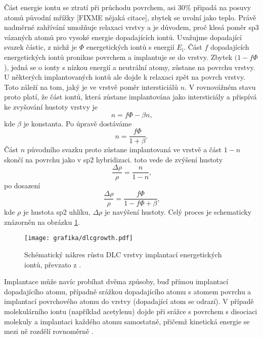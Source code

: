 Část energie iontu se ztratí při průchodu povrchem, asi 30\% připadá na posuvy atomů původní mřížky [FIXME nějaká citace], zbytek se uvolní jako teplo. Právě nadměrné zahřívání umožňuje relaxaci vrstvy a je důvodem, proč klesá poměr sp3 vázaných atomů pro vysoké energie dopadajících iontů. Uvažujme dopadající svazek částic, z nichž je $\Phi$ energetických iontů s energií $E_\mathrm{i}$. Část $f$ dopadajících energetických iontů pronikne povrchem a implantuje se do vrstvy. Zbytek $(1-f \Phi$), jedná se o ionty s nízkou energií a neutrální atomy, zůstane na povrchu vrstvy. U některých implantovaných iontů ale dojde k relaxaci zpět na povrch vrstvy. Toto záleží na tom, jaký je ve vrstvě poměr intersticiálů $n$. V rovnovážném stavu proto platí, že část iontů, která zůstane implantována jako intersticiály a přispívá ke zvyšování hustoty vrstvy je 
\begin{equation}
n = f \Phi - \beta n \text{,}
\end{equation}
kde $\beta$ je konstanta. Po úpravě dostáváme
\begin{equation}
n = \frac{f \Phi}{1 + \beta} \text{.}
\end{equation} 
Část $n$ původního svazku proto zůstane implantovaná ve vrstvě a část $1-n$ skončí na povrchu jako v sp2 hybridizaci. toto vede de zvýšení hustoty
\begin{equation}
\frac{\Delta \rho}{\rho} = \frac{n}{1-n} \text{,}
\end{equation}  
po dosazení
\begin{equation}
\frac{\Delta \rho}{\rho} = \frac{f \Phi}{1 - f \Phi + \beta} \text{,}
\end{equation}
kde $\rho$ je hustota sp2 uhlíku, $\Delta \rho$ je navýšení hustoty. Celý proces je schematicky znázorněn na obrázku \ref{dlcgrowth}.

\begin{figure}[htbp]
  \centering
  \texttt{[image: grafika/dlcgrowth.pdf]}
  \caption{Schématický nákres růstu DLC vrstvy implantací energetických iontů, převzato z \cite{Robertson2002}.}
  \label{dlcgrowth}
\end{figure}

Implantace může navíc probíhat dvěma způsoby, buď přímou implantací dopadajícího atomu, případně srážkou dopadajícího atomu s atomem povrchu a implantací povrchového atomu do vrstvy (dopadající atom se odrazí). V případě molekulárního iontu (například acetylenu) dojde při srážce s povrchem s disociaci molekuly a implantaci každého atomu samostatně, přičemž kinetická energie se mezi ně rozdělí rovnoměrně \cite{Robertson2002}.

